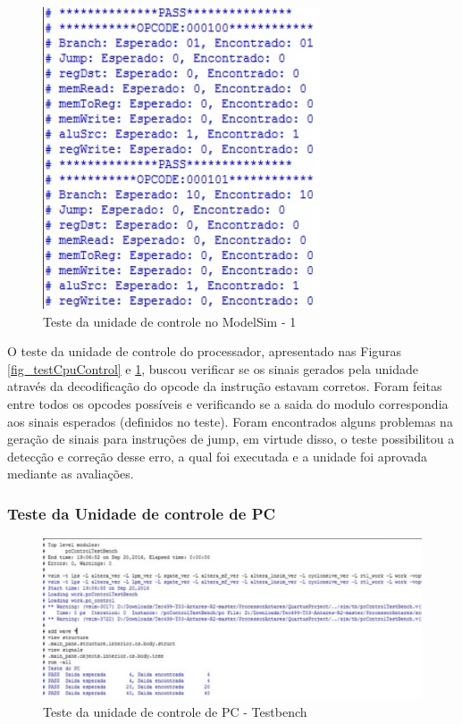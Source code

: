 \documentclass[
	11pt,				%
	openany,			%
	oneside,
	a4paper,			%
	chapter=TITLE,		%
	section=TITLE,		%
	english,			%
	brazil				%
	]{abntex2}
\begin{document}
\begin{figure}[htb]
	\caption{\label{fig_testCpuControl2}Teste da unidade de controle no ModelSim - 1}
	\begin{center}
	    \includegraphics[scale=0.8]{cpucontroltest3.PNG}
	\end{center}
\end{figure}

O teste da unidade de controle do processador, apresentado nas Figuras  \ref{fig_testCpuControl} e \ref{fig_testCpuControl2}, buscou verificar se os sinais gerados pela unidade através da decodificação do opcode da instrução estavam corretos. Foram feitas entre todos os opcodes possíveis e verificando se a saida do modulo correspondia aos sinais esperados (definidos no teste). Foram encontrados alguns problemas na geração de sinais para instruções de jump, em virtude disso, o teste possibilitou a detecção e correção desse erro, a qual foi executada e a unidade foi aprovada mediante as avaliações.


\subsubsection{Teste da Unidade de controle de PC}

\begin{figure}[H]
	\caption{\label{fig_testPcControl1}Teste da unidade de controle de PC - Testbench}
	\begin{center}
	    \includegraphics[scale=0.5]{pcControlTestbench.png}
	\end{center}
\end{figure}
\end{document}
